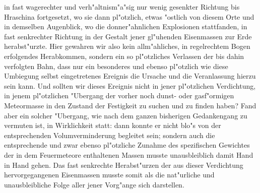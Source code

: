 \documentclass[a4paper, 8pt, oneside, polutonikogreek, german]{article}
\begin{document}
in fast wagerechter und verh"altnism"a"sig nur wenig gesenkter Richtung bis Hraschina fortgesetzt, wo sie dann pl"otzlich, etwas "ostlich von diesem Orte und in demselben Augenblick, wo die donner"ahnlichen Explosionen stattfanden, in fast senkrechter Richtung in der Gestalt jener gl"uhenden Eisenmassen zur Erde herabst"urzte. Hier gewahren wir also kein allm"ahliches, in regelrechtem Bogen erfolgendes Herabkommen, sondern ein so pl"otzliches Verlassen der bis dahin verfolgten Bahn, dass nur ein besonderes und ebenso pl"otzlich wie diese Umbiegung selbst eingetretenes Ereignis die Ursache und die Veranlassung hierzu sein kann. Und sollten wir dieses Ereignis nicht in jener pl"otzlichen Verdichtung, in jenem pl"otzlichen "Ubergang der vorher noch dunst- oder gasf"ormigen Meteormasse in den Zustand der Festigkeit zu suchen und zu finden haben? Fand aber ein solcher "Ubergang, wie nach dem ganzen bisherigen Gedankengang zu vermuten ist, in Wirklichkeit statt: dann konnte er nicht blo"s von der entsprechenden Volumverminderung begleitet sein; sondern auch die entsprechende und zwar ebenso pl"otzliche Zunahme des spezifischen Gewichtes der in dem Feuermeteore enthaltenen Massen musste unausbleiblich damit Hand in Hand gehen. Das fast senkrechte Herabst"urzen der aus dieser Verdichtung hervorgegangenen Eisenmassen musste somit als die nat"urliche und unausbleibliche Folge aller jener Vorg"ange sich darstellen.
\end{document}
